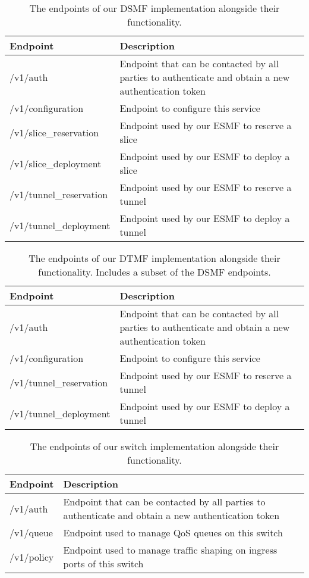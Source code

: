 \begin{table}[htp]
    \begin{tabularx}{\textwidth}{ |l|X| }
        \hline
        \textbf{Endpoint} & \textbf{Description} \\
        \hline
         /v1/auth & Endpoint that can be contacted by all parties to authenticate and obtain a new authentication token \\
         /v1/configuration & Endpoint to configure this service \\
        \hline
         /v1/slice\_reservation & Endpoint used by our ESMF to reserve a slice \\
         /v1/slice\_deployment & Endpoint used by our ESMF to deploy a slice \\
         /v1/tunnel\_reservation & Endpoint used by our ESMF to reserve a tunnel  \\
         /v1/tunnel\_deployment & Endpoint used by our ESMF to deploy a tunnel \\
        \hline
    \end{tabularx}
    \caption{The endpoints of our DSMF implementation alongside their functionality.}
    \label{table:dsmf}
\end{table}

\begin{table}[htp]
    \begin{tabularx}{\textwidth}{ |l|X| }
        \hline
        \textbf{Endpoint} & \textbf{Description} \\
        \hline
         /v1/auth & Endpoint that can be contacted by all parties to authenticate and obtain a new authentication token \\
         /v1/configuration & Endpoint to configure this service \\
        \hline
         /v1/tunnel\_reservation & Endpoint used by our ESMF to reserve a tunnel  \\
         /v1/tunnel\_deployment & Endpoint used by our ESMF to deploy a tunnel \\
        \hline
    \end{tabularx}
    \caption{The endpoints of our DTMF implementation alongside their functionality. Includes a subset of the DSMF endpoints.}
    \label{table:dtmf}
\end{table}

\begin{table}[htp]
    \begin{tabularx}{\textwidth}{ |l|X| }
        \hline
        \textbf{Endpoint} & \textbf{Description} \\
        \hline
         /v1/auth & Endpoint that can be contacted by all parties to authenticate and obtain a new authentication token \\
        \hline
         /v1/queue & Endpoint used to manage QoS queues on this switch \\
         /v1/policy & Endpoint used to manage traffic shaping on ingress ports of this switch \\
        \hline
    \end{tabularx}
    \caption{The endpoints of our switch implementation alongside their functionality.}
    \label{table:switch}
\end{table}

